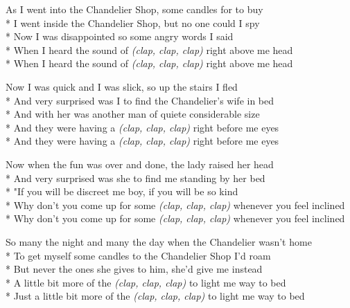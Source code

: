 \begin{SongText}
    \begin{SongVerse}
        As I went into the Chandelier Shop, some candles for to buy\\*%
        I went inside the Chandelier Shop, but no one could I spy\\*%
        Now I was disappointed so some angry words I said\\*%
        When I heard the sound of \emph{(clap, clap, clap)} right above me head\\*%
        When I heard the sound of \emph{(clap, clap, clap)} right above me head
    \end{SongVerse}
    \begin{SongVerse}
        Now I was quick and I was slick, so up the stairs I fled\\*%
        And very surprised was I to find the Chandelier's wife in bed\\*%
        And with her was another man of quiete considerable size\\*%
        And they were having a \emph{(clap, clap, clap)} right before me eyes\\*%
        And they were having a \emph{(clap, clap, clap)} right before me eyes
    \end{SongVerse}
    \begin{SongVerse}
        Now when the fun was over and done, the lady raised her head\\*%
        And very surprised was she to find me standing by her bed\\*%
        "If you will be discreet me boy, if you will be so kind\\*%
        Why don't you come up for some \emph{(clap, clap, clap)} whenever you feel inclined\\*%
        Why don't you come up for some \emph{(clap, clap, clap)} whenever you feel inclined
    \end{SongVerse}
    \begin{SongVerse}
        So many the night and many the day when the Chandelier wasn't home\\*%
        To get myself some candles to the Chandelier Shop I'd roam\\*%
        But never the ones she gives to him, she'd give me instead\\*%
        A little bit more of the \emph{(clap, clap, clap)} to light me way to bed\\*%
        Just a little bit more of the \emph{(clap, clap, clap)} to light me way to bed

\end{SongVerse}
\end{SongText}
